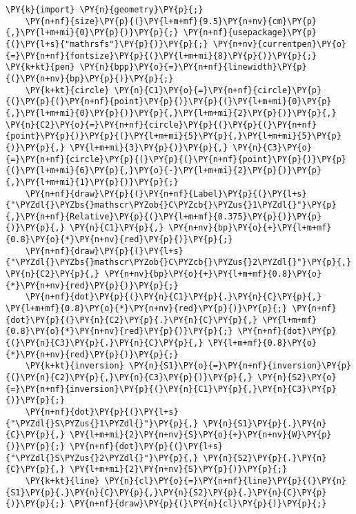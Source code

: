 \begin{Verbatim}[commandchars=\\\{\}]
    \PY{k}{import} \PY{n}{geometry}\PY{p}{;}
    \PY{n+nf}{size}\PY{p}{(}\PY{l+m+mf}{9.5}\PY{n+nv}{cm}\PY{p}{,}\PY{l+m+mi}{0}\PY{p}{)}\PY{p}{;} \PY{n+nf}{usepackage}\PY{p}{(}\PY{l+s}{"mathrsfs"}\PY{p}{)}\PY{p}{;} \PY{n+nv}{currentpen}\PY{o}{=}\PY{n+nf}{fontsize}\PY{p}{(}\PY{l+m+mi}{8}\PY{p}{)}\PY{p}{;} \PY{k+kt}{pen} \PY{n}{bpp}\PY{o}{=}\PY{n+nf}{linewidth}\PY{p}{(}\PY{n+nv}{bp}\PY{p}{)}\PY{p}{;}
    \PY{k+kt}{circle} \PY{n}{C1}\PY{o}{=}\PY{n+nf}{circle}\PY{p}{(}\PY{p}{(}\PY{n+nf}{point}\PY{p}{)}\PY{p}{(}\PY{l+m+mi}{0}\PY{p}{,}\PY{l+m+mi}{0}\PY{p}{)}\PY{p}{,}\PY{l+m+mi}{2}\PY{p}{)}\PY{p}{,} \PY{n}{C2}\PY{o}{=}\PY{n+nf}{circle}\PY{p}{(}\PY{p}{(}\PY{n+nf}{point}\PY{p}{)}\PY{p}{(}\PY{l+m+mi}{5}\PY{p}{,}\PY{l+m+mi}{5}\PY{p}{)}\PY{p}{,} \PY{l+m+mi}{3}\PY{p}{)}\PY{p}{,} \PY{n}{C3}\PY{o}{=}\PY{n+nf}{circle}\PY{p}{(}\PY{p}{(}\PY{n+nf}{point}\PY{p}{)}\PY{p}{(}\PY{l+m+mi}{6}\PY{p}{,}\PY{o}{-}\PY{l+m+mi}{2}\PY{p}{)}\PY{p}{,}\PY{l+m+mi}{1}\PY{p}{)}\PY{p}{;}
    \PY{n+nf}{draw}\PY{p}{(}\PY{n+nf}{Label}\PY{p}{(}\PY{l+s}{"\PYZdl{}\PYZbs{}mathscr\PYZob{}C\PYZcb{}\PYZus{}1\PYZdl{}"}\PY{p}{,}\PY{n+nf}{Relative}\PY{p}{(}\PY{l+m+mf}{0.375}\PY{p}{)}\PY{p}{)}\PY{p}{,} \PY{n}{C1}\PY{p}{,} \PY{n+nv}{bp}\PY{o}{+}\PY{l+m+mf}{0.8}\PY{o}{*}\PY{n+nv}{red}\PY{p}{)}\PY{p}{;}
    \PY{n+nf}{draw}\PY{p}{(}\PY{l+s}{"\PYZdl{}\PYZbs{}mathscr\PYZob{}C\PYZcb{}\PYZus{}2\PYZdl{}"}\PY{p}{,} \PY{n}{C2}\PY{p}{,} \PY{n+nv}{bp}\PY{o}{+}\PY{l+m+mf}{0.8}\PY{o}{*}\PY{n+nv}{red}\PY{p}{)}\PY{p}{;}
    \PY{n+nf}{dot}\PY{p}{(}\PY{n}{C1}\PY{p}{.}\PY{n}{C}\PY{p}{,} \PY{l+m+mf}{0.8}\PY{o}{*}\PY{n+nv}{red}\PY{p}{)}\PY{p}{;} \PY{n+nf}{dot}\PY{p}{(}\PY{n}{C2}\PY{p}{.}\PY{n}{C}\PY{p}{,} \PY{l+m+mf}{0.8}\PY{o}{*}\PY{n+nv}{red}\PY{p}{)}\PY{p}{;} \PY{n+nf}{dot}\PY{p}{(}\PY{n}{C3}\PY{p}{.}\PY{n}{C}\PY{p}{,} \PY{l+m+mf}{0.8}\PY{o}{*}\PY{n+nv}{red}\PY{p}{)}\PY{p}{;}
    \PY{k+kt}{inversion} \PY{n}{S1}\PY{o}{=}\PY{n+nf}{inversion}\PY{p}{(}\PY{n}{C2}\PY{p}{,}\PY{n}{C3}\PY{p}{)}\PY{p}{,} \PY{n}{S2}\PY{o}{=}\PY{n+nf}{inversion}\PY{p}{(}\PY{n}{C1}\PY{p}{,}\PY{n}{C3}\PY{p}{)}\PY{p}{;}
    \PY{n+nf}{dot}\PY{p}{(}\PY{l+s}{"\PYZdl{}S\PYZus{}1\PYZdl{}"}\PY{p}{,} \PY{n}{S1}\PY{p}{.}\PY{n}{C}\PY{p}{,} \PY{l+m+mi}{2}\PY{n+nv}{S}\PY{o}{+}\PY{n+nv}{W}\PY{p}{)}\PY{p}{;} \PY{n+nf}{dot}\PY{p}{(}\PY{l+s}{"\PYZdl{}S\PYZus{}2\PYZdl{}"}\PY{p}{,} \PY{n}{S2}\PY{p}{.}\PY{n}{C}\PY{p}{,} \PY{l+m+mi}{2}\PY{n+nv}{S}\PY{p}{)}\PY{p}{;}
    \PY{k+kt}{line} \PY{n}{cl}\PY{o}{=}\PY{n+nf}{line}\PY{p}{(}\PY{n}{S1}\PY{p}{.}\PY{n}{C}\PY{p}{,}\PY{n}{S2}\PY{p}{.}\PY{n}{C}\PY{p}{)}\PY{p}{;} \PY{n+nf}{draw}\PY{p}{(}\PY{n}{cl}\PY{p}{)}\PY{p}{;}

\end{Verbatim}
